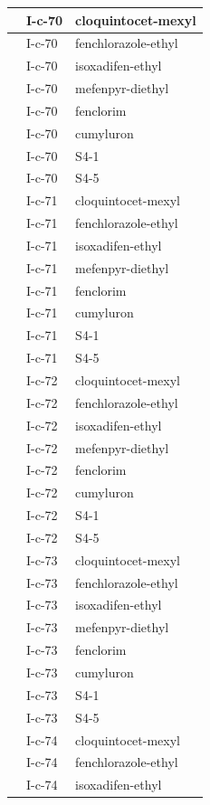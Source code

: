 \documentclass[11pt,a4paper]{article}
\begin{document}
\begin{table}[h]
\begin{tabular}{|l|l|l|}
 & I-c-70 & cloquintocet-mexyl \\ \hline
 & I-c-70 & fenchlorazole-ethyl \\ \hline
 & I-c-70 & isoxadifen-ethyl \\ \hline
 & I-c-70 & mefenpyr-diethyl \\ \hline
 & I-c-70 & fenclorim \\ \hline
 & I-c-70 & cumyluron \\ \hline
 & I-c-70 & S4-1 \\ \hline
 & I-c-70 & S4-5 \\ \hline
 & I-c-71 & cloquintocet-mexyl \\ \hline
 & I-c-71 & fenchlorazole-ethyl \\ \hline
 & I-c-71 & isoxadifen-ethyl \\ \hline
 & I-c-71 & mefenpyr-diethyl \\ \hline
 & I-c-71 & fenclorim \\ \hline
 & I-c-71 & cumyluron \\ \hline
 & I-c-71 & S4-1 \\ \hline
 & I-c-71 & S4-5 \\ \hline
 & I-c-72 & cloquintocet-mexyl \\ \hline
 & I-c-72 & fenchlorazole-ethyl \\ \hline
 & I-c-72 & isoxadifen-ethyl \\ \hline
 & I-c-72 & mefenpyr-diethyl \\ \hline
 & I-c-72 & fenclorim \\ \hline
 & I-c-72 & cumyluron \\ \hline
 & I-c-72 & S4-1 \\ \hline
 & I-c-72 & S4-5 \\ \hline
 & I-c-73 & cloquintocet-mexyl \\ \hline
 & I-c-73 & fenchlorazole-ethyl \\ \hline
 & I-c-73 & isoxadifen-ethyl \\ \hline
 & I-c-73 & mefenpyr-diethyl \\ \hline
 & I-c-73 & fenclorim \\ \hline
 & I-c-73 & cumyluron \\ \hline
 & I-c-73 & S4-1 \\ \hline
 & I-c-73 & S4-5 \\ \hline
 & I-c-74 & cloquintocet-mexyl \\ \hline
 & I-c-74 & fenchlorazole-ethyl \\ \hline
 & I-c-74 & isoxadifen-ethyl \\ \hline

\end{tabular}
\end{table}
\end{document}
